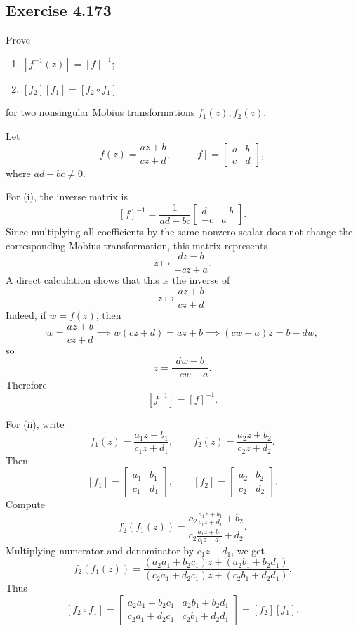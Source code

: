 \documentclass{article}
\begin{document}
\subsection{Exercise 4.173}

Prove

\begin{enumerate}
  \item[(i)] $[f^{-1}(z)]=[f]^{-1}$;
  \item[(ii)] $[f_2][f_1]=[f_2\circ f_1]$
\end{enumerate}
for two nonsingular Mobius transformations $f_1(z),f_2(z)$.

\begin{solution}
  Let
  \[
    f(z)=\frac{az+b}{cz+d},
    \qquad
    [f]=
    \begin{bmatrix}
      a & b \\
      c & d
    \end{bmatrix},
  \]
  where $ad-bc\ne0$.

  For (i), the inverse matrix is
  \[
    [f]^{-1}
    =
    \frac1{ad-bc}
    \begin{bmatrix}
      d & -b \\
      -c & a
    \end{bmatrix}.
  \]
  Since multiplying all coefficients by the same nonzero scalar does not
  change the corresponding Mobius transformation, this matrix represents
  \[
    z\mapsto
    \frac{dz-b}{-cz+a}.
  \]
  A direct calculation shows that this is the inverse of
  \[
    z\mapsto \frac{az+b}{cz+d}.
  \]
  Indeed, if $w=f(z)$, then
  \[
    w=\frac{az+b}{cz+d}
    \implies
    w(cz+d)=az+b
    \implies
    (cw-a)z=b-dw,
  \]
  so
  \[
    z=\frac{dw-b}{-cw+a}.
  \]
  Therefore
  \[
    [f^{-1}]=[f]^{-1}.
  \]

  For (ii), write
  \[
    f_1(z)=\frac{a_1z+b_1}{c_1z+d_1},
    \qquad
    f_2(z)=\frac{a_2z+b_2}{c_2z+d_2}.
  \]
  Then
  \[
    [f_1]=
    \begin{bmatrix}
      a_1 & b_1 \\
      c_1 & d_1
    \end{bmatrix},
    \qquad
    [f_2]=
    \begin{bmatrix}
      a_2 & b_2 \\
      c_2 & d_2
    \end{bmatrix}.
  \]
  Compute
  \[
    f_2(f_1(z))
    =
    \frac{
      a_2\frac{a_1z+b_1}{c_1z+d_1}+b_2
    }{
      c_2\frac{a_1z+b_1}{c_1z+d_1}+d_2
    }.
  \]
  Multiplying numerator and denominator by $c_1z+d_1$, we get
  \[
    f_2(f_1(z))
    =
    \frac{
      (a_2a_1+b_2c_1)z+(a_2b_1+b_2d_1)
    }{
      (c_2a_1+d_2c_1)z+(c_2b_1+d_2d_1)
    }.
  \]
  Thus
  \[
    [f_2\circ f_1]
    =
    \begin{bmatrix}
      a_2a_1+b_2c_1 & a_2b_1+b_2d_1 \\
      c_2a_1+d_2c_1 & c_2b_1+d_2d_1
    \end{bmatrix}
    =
    [f_2][f_1].
  \]
\end{solution}
\end{document}
